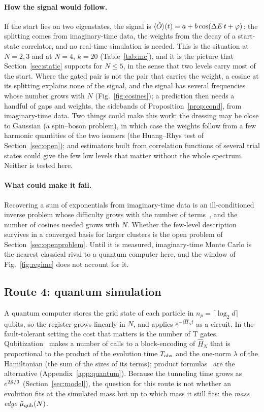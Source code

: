 \paragraph{How the signal would follow.} If the start lies on two eigenstates, the signal is $\langle\hat O\rangle(t)=a+b\cos(\Delta E\,t+\varphi)$: the splitting comes from imaginary-time data, the weights from the decay of a start-state correlator, and no real-time simulation is needed. This is the situation at $N=2,3$ and at $N=4$, $k=20$ (Table~\ref{tab:mc}), and it is the picture that Section~\ref{sec:static} supports for $N\le5$, in the sense that two levels carry most of the start. Where the gated pair is not the pair that carries the weight, a cosine at its splitting explains none of the signal, and the signal has several frequencies whose number grows with $N$ (Fig.~\ref{fig:cosines}); a prediction then needs a handful of gaps and weights, the sidebands of Proposition~\ref{prop:cond}, from imaginary-time data. Two things could make this work: the dressing may be close to Gaussian (a spin--boson problem), in which case the weights follow from a few harmonic quantities of the two isomers (the Huang--Rhys test of Section~\ref{sec:open}); and estimators built from correlation functions of several trial states could give the few low levels that matter without the whole spectrum. Neither is tested here.

\paragraph{What could make it fail.} Recovering a sum of exponentials from imaginary-time data is an ill-conditioned inverse problem whose difficulty grows with the number of terms~\cite{jarrell1996}, and the number of cosines needed grows with $N$. Whether the few-level description survives in a converged basis for larger clusters is the open problem of Section~\ref{sec:openproblem}. Until it is measured, imaginary-time Monte Carlo is the nearest classical rival to a quantum computer here, and the window of Fig.~\ref{fig:regime} does not account for it.

\subsection{Route 4: quantum simulation}

A quantum computer stores the grid state of each particle in $n_p=\lceil\log_2 d\rceil$ qubits, so the register grows linearly in $N$, and applies $e^{-i\hat H_Nt}$ as a circuit. In the fault-tolerant setting the cost that matters is the number of T gates. Qubitization~\cite{low2019qubitization} makes a number of calls to a block-encoding of $\hat H_N$ that is proportional to the product of the evolution time $T_{\mathrm{obs}}$ and the one-norm $\lambda$ of the Hamiltonian (the sum of the sizes of its terms); product formulas~\cite{childs2021trotter} are the alternative (Appendix~\ref{app:quantum}). Because the tunneling time grows as $e^{2\tilde{\mu}/3}$ (Section~\ref{sec:model}), the question for this route is not whether an evolution fits at the simulated mass but up to which mass it still fits: the \emph{mass edge} $\tilde\mu_{\mathrm{qub}}(N)$.

